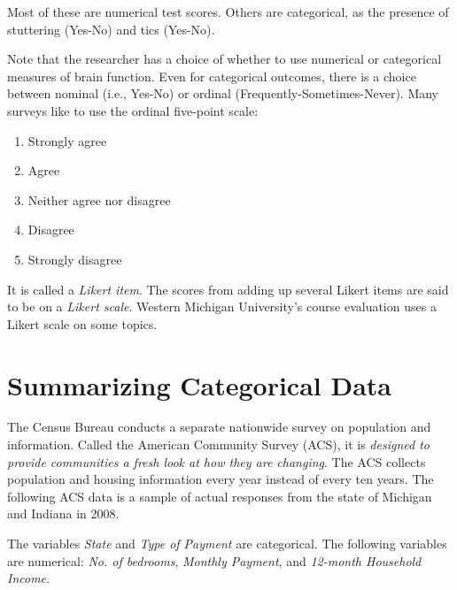 \documentclass[11pt]{book}\usepackage[]{graphicx}\usepackage[]{color}
\begin{document}
Most of these are numerical test scores.  Others are categorical, as the presence of stuttering (Yes-No) and tics (Yes-No).

Note that the researcher has a choice of whether to use numerical or categorical measures of brain function.  Even for categorical outcomes, there is a choice between nominal (i.e., Yes-No) or ordinal (Frequently-Sometimes-Never). Many surveys like to use the ordinal five-point scale:

{\small{
\begin{enumerate}
\item Strongly agree
\item Agree
\item Neither agree nor disagree
\item Disagree
\item Strongly disagree
\end{enumerate}
}}

It is called a \textit{Likert item}.  The scores from adding up several Likert items are said to be on a \textit{Likert scale}.  Western Michigan University's course evaluation uses a Likert scale on some topics.

\section{Summarizing Categorical Data}

The Census Bureau conducts a separate nationwide survey on population and information.  Called the American Community Survey (ACS), it is \textit{designed to provide communities a fresh look at how they are changing}. The ACS collects population and housing information every year instead of every ten years.  The following ACS data is a sample of actual responses from the state of Michigan and Indiana in 2008.

The variables \textit{State} and \textit{Type of Payment} are categorical.  The following variables  are numerical: \textit{No. of bedrooms},  \textit{Monthly Payment}, and \textit{12-month Household Income}.
\end{document}
